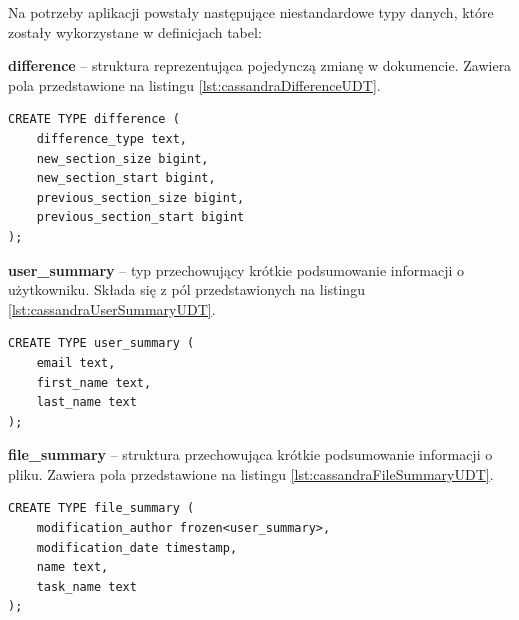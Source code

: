Na potrzeby aplikacji powstały następujące niestandardowe typy danych, które zostały wykorzystane w definicjach tabel:
\begin{itemize}
    \item \textbf{difference} -- struktura reprezentująca pojedynczą zmianę w dokumencie.
    Zawiera pola przedstawione na listingu \ref{lst:cassandraDifferenceUDT}.
    
    \begin{minipage}{\linewidth}
    \begin{lstlisting}[language=CQL,caption={Definicja niestandardowego typu \textit{difference}},label={lst:cassandraDifferenceUDT}]
CREATE TYPE difference (
    difference_type text,
    new_section_size bigint,
    new_section_start bigint,
    previous_section_size bigint,
    previous_section_start bigint
);
    \end{lstlisting}
    \end{minipage}
    
    \item \textbf{user\_summary} -- typ przechowujący krótkie podsumowanie informacji o użytkowniku.
    Składa się z pól przedstawionych na listingu \ref{lst:cassandraUserSummaryUDT}.
    
    \begin{minipage}{\linewidth}
    \begin{lstlisting}[language=CQL,caption={Definicja niestandardowego typu \textit{user\_summary}},label={lst:cassandraUserSummaryUDT}]
CREATE TYPE user_summary (
    email text,
    first_name text,
    last_name text
);
    \end{lstlisting}
    \end{minipage}
    
    \begin{minipage}{\linewidth}
    \item \textbf{file\_summary} -- struktura przechowująca krótkie podsumowanie informacji o pliku.
    Zawiera pola przedstawione na listingu \ref{lst:cassandraFileSummaryUDT}.
    \begin{lstlisting}[language=CQL,caption={Definicja niestandardowego typu \textit{file\_summary}},label={lst:cassandraFileSummaryUDT}]
CREATE TYPE file_summary (
    modification_author frozen<user_summary>,
    modification_date timestamp,
    name text,
    task_name text
);
    \end{lstlisting}
    \end{minipage}
    

\end{itemize}
